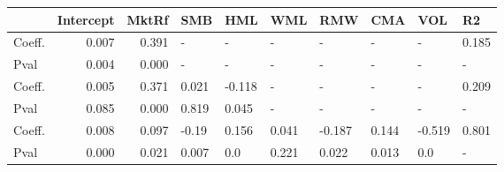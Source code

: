 \begin{tabular}{lrrlllllll}
\toprule
{} &  Intercept &  MktRf &    SMB &    HML &    WML &    RMW &    CMA &    VOL &     R2 \\
\midrule
Coeff.  &      0.007 &  0.391 &      - &      - &      - &      - &      - &      - &  0.185 \\
Pval    &      0.004 &  0.000 &      - &      - &      - &      - &      - &      - &      - \\
Coeff.  &      0.005 &  0.371 &  0.021 & -0.118 &      - &      - &      - &      - &  0.209 \\
Pval    &      0.085 &  0.000 &  0.819 &  0.045 &      - &      - &      - &      - &      - \\
Coeff.  &      0.008 &  0.097 &  -0.19 &  0.156 &  0.041 & -0.187 &  0.144 & -0.519 &  0.801 \\
Pval    &      0.000 &  0.021 &  0.007 &    0.0 &  0.221 &  0.022 &  0.013 &    0.0 &      - \\
\bottomrule
\end{tabular}
